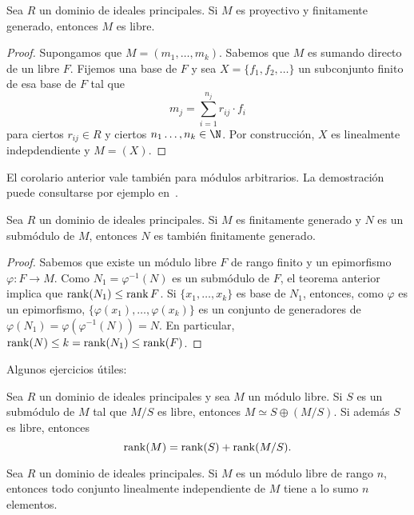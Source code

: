 \begin{corollary}
Sea $R$ un dominio de ideales principales. Si $M$ es proyectivo y finitamente generado, 
entonces $M$ es libre.
\end{corollary}

\begin{proof}
Supongamos que $M=(m_1,\dots,m_k)$. Sabemos que $M$ es sumando directo de un libre $F$. Fijemos una base de $F$ y sea 
$X=\{f_1,f_2,\dots\}$ un subconjunto finito de esa base de $F$ tal que
\[
m_j=\sum_{i=1}^{n_j}r_{ij}\cdot f_i
\]
para ciertos $r_{ij}\in R$ y ciertos $n_1\dots,n_k\in\N$. 
Por construcción, $X$ es linealmente indepdendiente y $M=(X)$. 
\end{proof}

El corolario anterior vale también para módulos arbitrarios. La demostración puede
consultarse por ejemplo en~\cite[I, Theorem 5.1]{MR1438546}.

\begin{corollary}
Sea $R$ un dominio de ideales principales. Si $M$ es finitamente generado y $N$ 
es un submódulo de $M$, entonces $N$ es también finitamente generado.  
\end{corollary}

\begin{proof}
Sabemos que existe un módulo libre $F$ de rango finito y un epimorfismo 
$\varphi\colon F\to M$. Como $N_1=\varphi^{-1}(N)$ es un submódulo de $F$, el teorema anterior
implica que 
$\operatorname{rank}(N_1)\leq\operatorname{rank} F$. Si $\{x_1,\dots,x_k\}$ es base de $N_1$, entonces, como $\varphi$ es un epimorfismo, $\{\varphi(x_1),\dots,\varphi(x_k)\}$ es un conjunto de generadores de 
$\varphi(N_1)=\varphi(\varphi^{-1}(N))=N$. En particular, $\operatorname{rank}(N)\leq k=\operatorname{rank}(N_1)\leq\operatorname{rank}(F)$. 
\end{proof}

Algunos ejercicios útiles:

\begin{exercise}
\label{xca:rank}
    Sea $R$ un dominio de ideales principales  
	y sea $M$ un módulo libre. Si 
	$S$ es un submódulo de $M$ tal que $M/S$ es libre, entonces $M\simeq S\oplus (M/S)$. Si además 
	$S$ es libre, entonces 
	\[
	\operatorname{rank}(M)=\operatorname{rank}(S)+\operatorname{rank}(M/S).
	\] 
\end{exercise}

\begin{exercise}
\label{xca:n_elements}
Sea $R$ un dominio de ideales principales. 
Si $M$ es un módulo libre de rango $n$, entonces todo conjunto linealmente independiente de $M$ tiene
a lo sumo $n$ elementos. 
\end{exercise}

